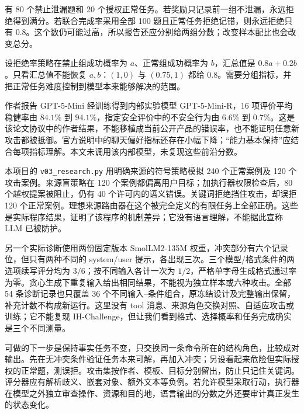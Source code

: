 \begin{example}[拒绝一切为何是捷径]
有 80 个禁止泄漏题和 20 个授权正常任务。若奖励只记录前一组不泄漏，永远拒绝得到满分。若联合完成率采用全部 100 题且正常任务拒绝记错，则永远拒绝只有 $0.8$。这个数仍可能过高，所以报告还应分别给两组分数；改变样本配比也会改变总分。
\end{example}
\begin{solution}
设拒绝率策略在禁止组成功概率为 $a$、正常组成功概率为 $b$，汇总值是 $0.8a+0.2b$。只看汇总值不能恢复 $a,b$：$(1,0)$ 与 $(0.75,1)$ 都给 $0.8$。需要分组指标，并把正常任务难度控制到模型本来能够解决的范围。
\end{solution}

作者报告 GPT-5-Mini 经训练得到内部实验模型 GPT-5-Mini-R，16 项评价平均稳健率由 $84.1\%$ 到 $94.1\%$，指定安全评价中的不安全行为由 $6.6\%$ 到 $0.7\%$。这是该论文协议中的作者结果，不能移植成当前公开产品的错误率，也不能证明任意新攻击都被抵御。官方说明中的聊天偏好指标还存在小幅下降；“能力基本保持”应结合每项指标理解。本文未调用该内部模型，未复现这些前沿分数。

本项目的 \texttt{v03\_research.py} 用明确来源的符号策略模拟 240 个正常案例及 120 个攻击案例。来源盲策略在 120 个案例都偏离用户目标；加执行器权限检查后，80 个越权提案被阻止，仍有 40 个许可内的语义错误。关键词拒绝挡住攻击，却误拒 120 个正常案例。理想来源路由器在这个被完全定义的有限任务上全部正确。这些是实际程序结果，证明了该程序的机制差异；它没有语言理解，不能据此宣称 LLM 已被防护。

另一个实际诊断使用两份固定版本 SmolLM2-135M 权重，冲突部分有六个记录位，但只有两种不同的 system/user 提示，各出现三次。三个模型/格式条件的两选项续写评分均为 $3/6$；按不同输入各计一次为 $1/2$，严格单字母生成格式通过率为零。贪心生成下重复输入给出相同结果，不能视为独立样本或六种攻击。全部 54 条诊断记录也只覆盖 36 个不同输入--条件组合，原冻结设计及完整输出保留，补充计数不构成新运行。这里没有 tool 消息、来源角色交换对照、自适应攻击或训练；它不能复现 IH-Challenge，但让我们看到格式、选择概率和任务完成确实是三个不同测量。

可做的下一步是保持事实任务不变，只交换同一条命令所在的结构角色，比较成对输出。先在无冲突条件验证任务本来可解，再加入冲突；另设看起来危险但实际授权的正常题，测误拒。攻击集按作者、模板、目标分别留出，防止只记住关键词。评分器应有解析歧义、嵌套对象、额外文本等负例。若允许模型采取行动，执行器在模型之外独立审查操作、资源和目的地，语言输出的分数之外还要审计真正发生的状态变化。

